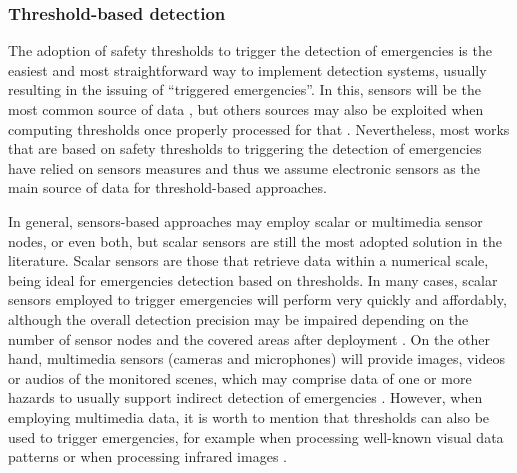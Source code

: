 \begin{refsection}
\subsubsection{Threshold-based detection}

The adoption of safety thresholds to trigger the detection of emergencies is the easiest and most straightforward way to implement detection systems, usually resulting in the issuing of ``triggered emergencies''. In this, sensors will be the most common source of data \cite{smartcities1,sensorsplatforms}, but others sources may also be exploited when computing thresholds once properly processed for that \cite{thresholdmedia1}. Nevertheless, most works that are based on safety thresholds to triggering the detection of emergencies have relied on sensors measures and thus we assume electronic sensors as the main source of data for threshold-based approaches.

In general, sensors-based approaches may employ scalar or multimedia sensor nodes, or even both, but scalar sensors are still the most adopted solution in the literature. Scalar sensors are those that retrieve data within a numerical scale, being ideal for emergencies detection based on thresholds. In many cases, scalar sensors employed to trigger emergencies will perform very quickly and affordably, although the overall detection precision may be impaired depending on the number of sensor nodes and the covered areas after deployment \cite{smartcities3,sensorsprecision1}. On the other hand, multimedia sensors (cameras and microphones) will provide images, videos or audios of the monitored scenes, which may comprise data of one or more hazards to usually support indirect detection of emergencies \cite{emergenciesmetric3,emergenciesmetric6}. However, when employing multimedia data, it is worth to mention that thresholds can also be used to trigger emergencies, for example when processing well-known visual data patterns or when processing infrared images \cite{cameraThreshold1,cameraThreshold2}.


\end{refsection}
